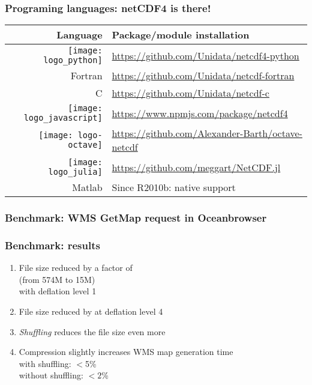 \begin{frame}
\frametitle{Programing languages: netCDF4 is there!}
\begin{table}
\begin{tabular}{rl}
\toprule
Language 	& 		Package/module installation \\
\midrule
\texttt{[image: logo\_python]}		& 		\url{https://github.com/Unidata/netcdf4-python}\\
Fortran											& 		\url{https://github.com/Unidata/netcdf-fortran}\\
C												& 		\url{https://github.com/Unidata/netcdf-c}\\
\texttt{[image: logo\_javascript]}	& 		\url{https://www.npmjs.com/package/netcdf4}\\
\texttt{[image: logo-octave]}		&		\url{https://github.com/Alexander-Barth/octave-netcdf}\\
\texttt{[image: logo\_julia]}		&  		\url{https://github.com/meggart/NetCDF.jl}\\
Matlab											&		Since R2010b: native support\\
\bottomrule
\end{tabular}
\end{table}


\end{frame}


\begin{frame}
\frametitle{Benchmark: WMS ​GetMap request in Oceanbrowser}
\begin{figure}
\centering
\end{figure}

\end{frame}


\begin{frame}
\frametitle{Benchmark: results}
\begin{enumerate}
\item File size reduced by a factor of \\
(from 574M to 15M)\\
with deflation level 1
\item File size reduced by  at deflation level 4
\item \textit{Shuffling} reduces the file size even more
\item Compression slightly increases WMS map generation time\\
with shuffling: $<$5\%\\
without shuffling: $<2$\%
\end{enumerate}

\end{frame}

